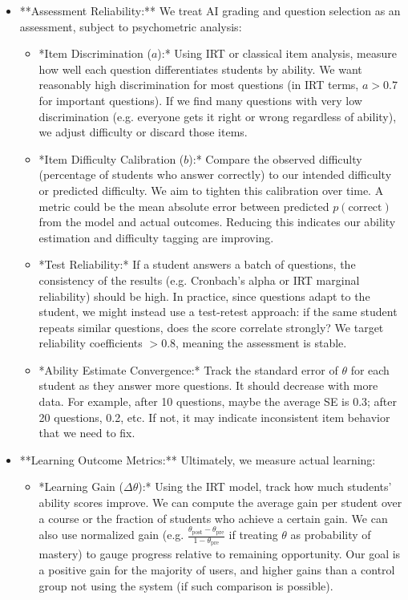 \documentclass[11pt]{article}
\begin{document}
\begin{itemize}
\begin{itemize}
    \end{itemize}
  \item **Assessment Reliability:** We treat AI grading and question selection as an assessment, subject to psychometric analysis:
    \begin{itemize}
      \item *Item Discrimination ($a$):* Using IRT or classical item analysis, measure how well each question differentiates students by ability. We want reasonably high discrimination for most questions (in IRT terms, $a>0.7$ for important questions). If we find many questions with very low discrimination (e.g. everyone gets it right or wrong regardless of ability), we adjust difficulty or discard those items.
      \item *Item Difficulty Calibration ($b$):* Compare the observed difficulty (percentage of students who answer correctly) to our intended difficulty or predicted difficulty. We aim to tighten this calibration over time. A metric could be the mean absolute error between predicted $p(\text{correct})$ from the model and actual outcomes. Reducing this indicates our ability estimation and difficulty tagging are improving.
      \item *Test Reliability:* If a student answers a batch of questions, the consistency of the results (e.g. Cronbach’s alpha or IRT marginal reliability) should be high. In practice, since questions adapt to the student, we might instead use a test-retest approach: if the same student repeats similar questions, does the score correlate strongly? We target reliability coefficients $>0.8$, meaning the assessment is stable.
      \item *Ability Estimate Convergence:* Track the standard error of $\theta$ for each student as they answer more questions. It should decrease with more data. For example, after 10 questions, maybe the average SE is 0.3; after 20 questions, 0.2, etc. If not, it may indicate inconsistent item behavior that we need to fix.
    \end{itemize}
  \item **Learning Outcome Metrics:** Ultimately, we measure actual learning:
    \begin{itemize}
      \item *Learning Gain ($\Delta \theta$):* Using the IRT model, track how much students’ ability scores improve. We can compute the average gain per student over a course or the fraction of students who achieve a certain gain. We can also use normalized gain (e.g. $\frac{\theta_{\text{post}} - \theta_{\text{pre}}}{1 - \theta_{\text{pre}}}$ if treating $\theta$ as probability of mastery) to gauge progress relative to remaining opportunity. Our goal is a positive gain for the majority of users, and higher gains than a control group not using the system (if such comparison is possible).

\end{itemize}
\end{itemize}
\end{document}
